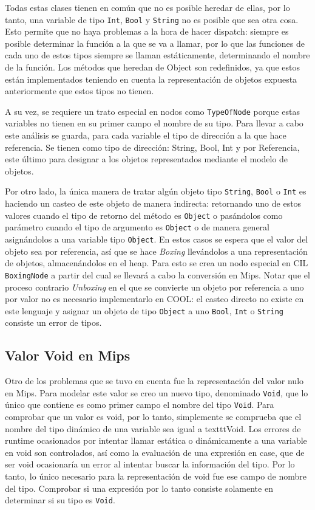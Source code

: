 \documentclass[11pt]{scrartcl} %
\begin{document}
Todas estas clases tienen en común que no es posible heredar de ellas, por lo tanto, una variable de tipo \texttt{Int}, \texttt{Bool} y \texttt{String} no es posible que sea otra cosa. Esto permite que no haya problemas a la hora de hacer dispatch: siempre es posible determinar la función a la que se va a llamar, por lo que las funciones de cada uno de estos tipos siempre se llaman estáticamente, determinando el nombre de la función. Los métodos que heredan de Object son redefinidos, ya que estos están implementados teniendo en cuenta la representación de objetos expuesta anteriormente que estos tipos no tienen.

A su vez, se requiere un trato especial en nodos como \texttt{TypeOfNode} porque estas variables no tienen en su primer campo el nombre de su tipo. Para llevar a cabo este análisis se guarda, para cada variable el tipo de dirección a la que hace referencia. Se tienen como tipo de dirección: String, Bool, Int y por Referencia, este último para designar a los objetos representados mediante el modelo de objetos.

Por otro lado, la única manera de tratar algún objeto tipo \texttt{String}, \texttt{Bool} o \texttt{Int} es haciendo un casteo de este objeto de manera indirecta: retornando uno de estos valores cuando el tipo de retorno del método es \texttt{Object} o pasándolos como parámetro cuando el tipo de argumento es \texttt{Object} o de manera general asignándolos a una variable tipo \texttt{Object}. En estos casos se espera que el valor del objeto sea por referencia, así que se hace \textit{Boxing} llevándolos a una representación de objetos, almacenándolos en el heap. Para esto se crea un nodo especial en CIL \texttt{BoxingNode} a partir del cual se llevará a cabo la conversión en Mips. Notar que el proceso contrario \textit{Unboxing} en el que se convierte un objeto por referencia a uno por valor no es necesario implementarlo en COOL: el casteo directo no existe en este lenguaje y asignar un objeto de tipo \texttt{Object} a uno \texttt{Bool}, \texttt{Int} o \texttt{String} consiste un error de tipos.

\subsection{Valor Void en Mips}

Otro de los problemas que se tuvo en cuenta fue la representación del valor nulo en Mips. Para modelar este valor se creo un nuevo tipo, denominado \texttt{Void}, que lo único que contiene es como primer campo el nombre del tipo \texttt{Void}. Para comprobar que un valor es void, por lo tanto, simplemente se comprueba que el nombre del tipo dinámico de una variable sea igual a texttt{Void}. Los errores de runtime ocasionados por intentar llamar estática o dinámicamente a una variable en void son controlados, así como la evaluación de una expresión en case, que de ser void ocasionaría un error al intentar buscar la información del tipo. Por lo tanto, lo único necesario para la representación de void fue ese campo de nombre del tipo. Comprobar si una expresión por lo tanto consiste solamente en determinar si su tipo es \texttt{Void}.


\end{document}
